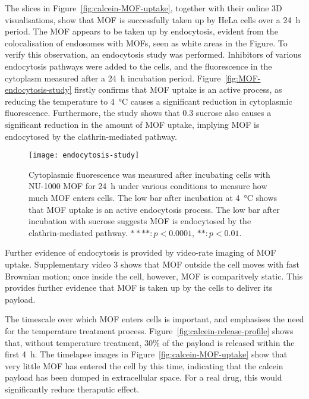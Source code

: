 The slices in Figure~\ref{fig:calcein-MOF-uptake}, together with their online 3D visualisations, show that MOF is successfully taken up by HeLa cells over a \SI{24}{\hour} period. 
The MOF appears to be taken up by endocytosis, evident from the colocalisation of endosomes with MOFs, seen as white areas in the Figure. 
To verify this observation, an endocytosis study was performed.
Inhibitors of various endocytosis pathways were added to the cells, and the fluorescence in the cytoplasm measured after a \SI{24}{\hour} incubation period. 
Figure~\ref{fig:MOF-endocytosis-study} firstly confirms that MOF uptake is an active process, as reducing the temperature to \SI{4}{\degreeCelsius} causes a significant reduction in cytoplasmic fluorescence. 
Furthermore, the study shows that \SI{0.3}{\Molar} sucrose also causes a significant reduction in the amount of MOF uptake, implying MOF is endocytosed by the clathrin-mediated pathway. 

\begin{figure}[htbp!]
\centering
\texttt{[image: endocytosis-study]}
\caption[MOFs: An endocytosis study shows NU-1000 MOF is taken up by HeLa cells through the clathrin-mediated pathway]{Cytoplasmic fluorescence was measured after incubating cells with NU-1000 MOF for \SI{24}{\hour} under various conditions to measure how much MOF enters cells. The low bar after incubation at \SI{4}{\degreeCelsius} shows that MOF uptake is an active endocytosis process. The low bar after incubation with sucrose suggests MOF is endocytosed by the clathrin-mediated pathway. $****: p<0.0001$, $**: p<0.01$. }
\label{fig:endocytosis-study}
\end{figure}

Further evidence of endocytosis is provided by video-rate imaging of MOF uptake.
Supplementary video 3 shows that MOF outside the cell moves with fast Brownian motion; once inside the cell, however, MOF is comparitvely static. 
This provides further evidence that MOF is taken up by the cells to deliver its payload. 

The timescale over which MOF enters cells is important, and emphasises the need for the temperature treatment process. 
Figure~\ref{fig:calcein-release-profile} shows that, without temperature treatment, 30\% of the payload is released within the first \SI{4}{\hour}. 
The timelapse images in Figure~\ref{fig:calcein-MOF-uptake} show that very little MOF has entered the cell by this time, indicating that the calcein payload has been dumped in extracellular space. 
For a real drug, this would significantly reduce theraputic effect. %


